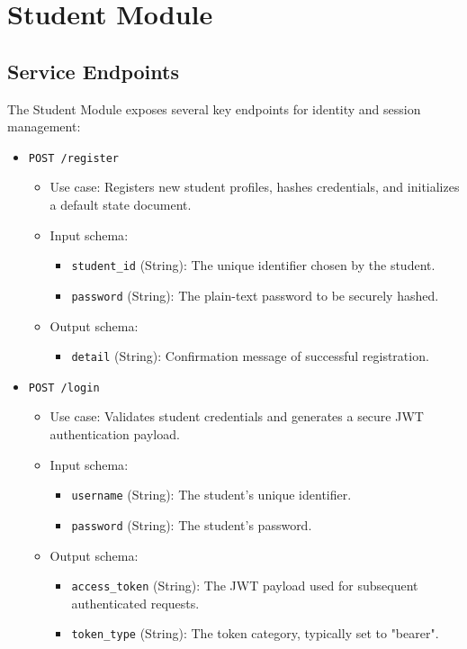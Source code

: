 \section{Student Module}
\subsection{Service Endpoints}
The Student Module exposes several key endpoints for identity and session management:

\begin{itemize}
    \item {\texttt{POST /register}}
    \begin{itemize}
        \item {Use case}: Registers new student profiles, hashes credentials, and initializes a default state document.
        \item {Input schema}:
        \begin{itemize}
            \item \texttt{student\_id} (String): The unique identifier chosen by the student.
            \item \texttt{password} (String): The plain-text password to be securely hashed.
        \end{itemize}
        \item {Output schema}:
        \begin{itemize}
            \item \texttt{detail} (String): Confirmation message of successful registration.
        \end{itemize}
    \end{itemize}

    \item {\texttt{POST /login}}
    \begin{itemize}
        \item {Use case}: Validates student credentials and generates a secure JWT authentication payload.
        \item {Input schema}:
        \begin{itemize}
            \item \texttt{username} (String): The student's unique identifier.
            \item \texttt{password} (String): The student's password.
        \end{itemize}
        \item {Output schema}:
        \begin{itemize}
            \item \texttt{access\_token} (String): The JWT payload used for subsequent authenticated requests.
            \item \texttt{token\_type} (String): The token category, typically set to "bearer".
        \end{itemize}
    \end{itemize}


\end{itemize}
